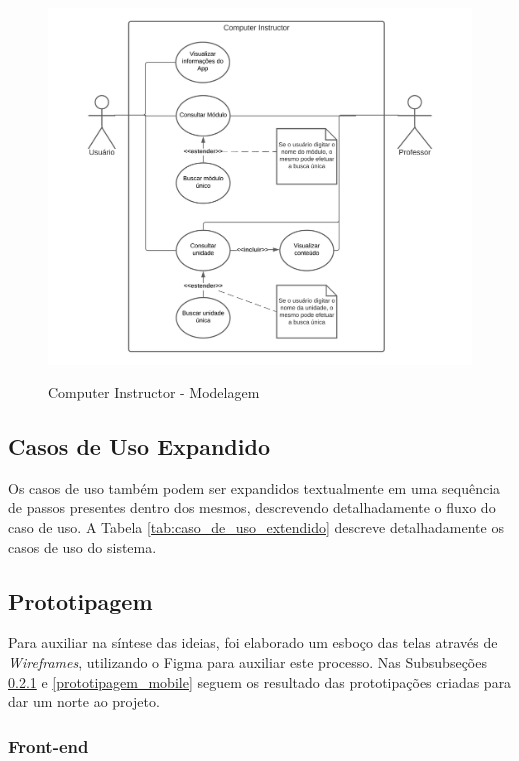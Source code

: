 \begin{figure}[H]
    \centering
    \caption{Computer Instructor - Modelagem}
    \includegraphics[width=1\textwidth]{figuras/Computer Instructor.png}
    \label{fig:computerInstructor_modelagem}
    {}
\end{figure}

\subsection{Casos de Uso Expandido}
\label{caso_de_uso_expandido}

Os casos de uso também podem ser expandidos textualmente em uma sequência de passos presentes dentro dos mesmos, descrevendo detalhadamente o fluxo do caso de uso. A Tabela \ref{tab:caso_de_uso_extendido} descreve detalhadamente os casos de uso do sistema.




\subsection{Prototipagem}
\label{prototipagem}
Para auxiliar na síntese das ideias, foi elaborado um esboço das telas através de \textit{Wireframes}, utilizando o Figma para auxiliar este processo. Nas Subsubseções \ref{prototipagem_front} e \ref{prototipagem_mobile} seguem os resultado das prototipações criadas para dar um norte ao projeto.


\subsubsection{Front-end}
\label{prototipagem_front}

